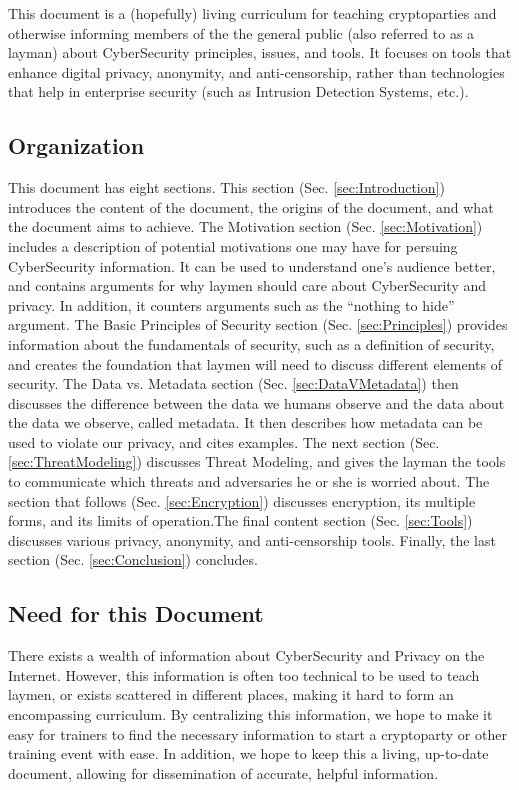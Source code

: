 This document is a (hopefully) living curriculum for teaching cryptoparties and otherwise informing members of the the general public (also referred to as a layman) about CyberSecurity principles, issues, and tools. It focuses on tools that enhance digital privacy, anonymity, and anti-censorship, rather than technologies that help in enterprise security (such as Intrusion Detection Systems, etc.).

\subsection{Organization}
This document has eight sections. This section (Sec. \ref{sec:Introduction}) introduces the content of the document, the origins of the document, and what the document aims to achieve. The Motivation section (Sec. \ref{sec:Motivation}) includes a description of potential motivations one may have for persuing CyberSecurity information. It can be used to understand one's audience better, and contains arguments for why laymen should care about CyberSecurity and privacy. In addition, it counters arguments such as the ``nothing to hide'' argument. The Basic Principles of Security section (Sec. \ref{sec:Principles}) provides information about the fundamentals of security, such as a definition of security, and creates the foundation that laymen will need to discuss different elements of security. The Data vs. Metadata section (Sec. \ref{sec:DataVMetadata}) then discusses the difference between the data we humans observe and the data about the data we observe, called metadata. It then describes how metadata can be used to violate our privacy, and cites examples. The next section (Sec. \ref{sec:ThreatModeling}) discusses Threat Modeling, and gives the layman the tools to communicate which threats and adversaries he or she is worried about. The section that follows (Sec. \ref{sec:Encryption}) discusses encryption, its multiple forms, and its limits of operation.The final content section (Sec. \ref{sec:Tools}) discusses various privacy, anonymity, and anti-censorship tools. Finally, the last section (Sec. \ref{sec:Conclusion}) concludes.

\subsection{Need for this Document}

There exists a wealth of information about CyberSecurity and Privacy on the Internet. However, this information is often too technical to be used to teach laymen, or exists scattered in different places, making it hard to form an encompassing curriculum. By centralizing this information, we hope to make it easy for trainers to find the necessary information to start a cryptoparty or other training event with ease. In addition, we hope to keep this a living, up-to-date document, allowing for dissemination of accurate, helpful information.

